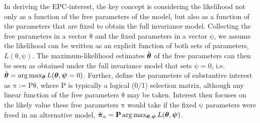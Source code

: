 \documentclass[letterpaper,12pt]{article}
\newcommand\vm[1]{%
\bm{\mathrm{#1}}}
\newcommand{\param}{\vm{\theta}}
\newcommand{\bpsi}{\vm{\psi}}
\newcommand{\that}{\hat{\vm{\theta}}}
\begin{document}

In deriving the EPC-interest, the key concept is considering the likelihood not only as a function of the free parameters of the model, but also as a function of the parameters that are fixed to obtain the full invariance model. Collecting the free parameters in a vector $\param$ and the fixed parameters in a vector $\bpsi$, we assume the likelihood can be written as an explicit function of both sets of parameters, $L(\param, \bpsi)$.  The maximum-likelihood estimates $\that$ of the free parameters can then be seen as obtained under the full invariance model that sets $\bpsi=0$, i.e. $\that = \arg\max_{\param} L(\param, \bpsi = 0)$. Further, define the parameters of substantive interest as $\vm{\pi} := \vm{P} \param$, where $\vm{P}$ is typically a logical (0/1) selection matrix, although any linear function of the free parameters $\param$ may be taken. 
Interest then focuses on the likely value these free parameters $\vm{\pi}$ would take if the fixed $\bpsi$ parameters were freed in an alternative model, $\hat{\vm{\pi}}_a = \vm{P} \arg\max_{\param, \bpsi} L(\param, \bpsi)$. 
\end{document}

